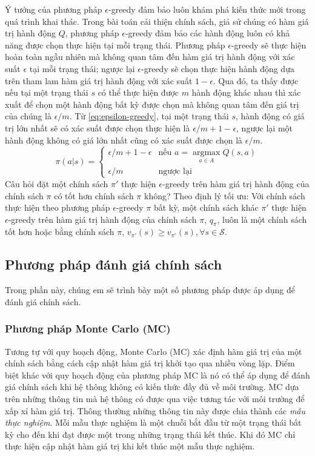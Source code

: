 Ý tưởng của phương pháp $\epsilon$-greedy đảm bảo luôn khám phá kiến thức mới trong quá trình khai thác. Trong bài toán cải thiện chính sách, giả sử chúng có hàm giá trị hành động $Q$, phương pháp $\epsilon$-greedy đảm bảo các hành động luôn có khả năng được chọn thực hiện tại mỗi trạng thái. Phương pháp $\epsilon$-greedy sẽ thực hiện hoàn toàn ngẫu nhiên mà không quan tâm đến hàm giá trị hành động với xác suất $\epsilon$ tại mỗi trạng thái; ngược lại $\epsilon$-greedy sẽ chọn thực hiện hành động dựa trên tham lam hàm giá trị hành động với xác suất $1 - \epsilon$. Qua đó, ta thấy được nếu tại một trạng thái $s$ có thể thực hiện được $m$ hành động khác nhau thì xác xuất để chọn một hành động bất kỳ được chọn mà không quan tâm đến giá trị của chúng là $\epsilon/m$. Từ \ref{eq:epsilon-greedy}, tại một trạng thái $s$, hành động có giá trị lớn nhất sẽ có xác suất được chọn thực hiện là $\epsilon/m + 1 - \epsilon$, ngược lại một hành động không có giá lớn nhất cũng có xác suất được chọn là $\epsilon/m$. 
\begin{equation}
\pi(a|s) =
\left\{\begin{matrix}
\epsilon/m + 1 - \epsilon & \text{nếu }a = \underset{a \in A}{\operatorname{argmax}}Q(s,a)\\ 
\epsilon/m & \text{ngược lại}
\end{matrix}\right.
\label{eq:epsilon-greedy}
\end{equation}
Câu hỏi đặt một chính sách $\pi'$ thực hiện $\epsilon$-greedy trên hàm giá trị hành động của  chính sách $\pi$ có tốt hơn chính sách $\pi$ không? Theo định lý tối ưu: Với chính sách thực hiện theo phương pháp $\epsilon$-greedy $\pi$ bất kỳ, một chính sách khác $\pi'$ thực hiện $\epsilon$-greedy trên hàm giá trị hành động của chính sách $\pi$, $q_{\pi}$, luôn là một chính sách tốt hơn hoặc bằng chính sách $\pi$, $v_{\pi'}(s) \geq v_{\pi'}(s), \forall s \in \mathcal{S}$.

\subsection{Phương pháp đánh giá chính sách}
Trong phần này, chúng em sẽ trình bày một số phương pháp được áp dụng để đánh giá chính sách.


\subsubsection{Phương pháp Monte Carlo (MC)}
Tương tự với quy hoạch động, Monte Carlo (MC) xác định hàm giá trị của một chính sách bằng cách cập nhật hàm giá trị khởi tạo qua nhiều vòng lặp. Điểm biệt khác với quy hoạch động của phương pháp MC là nó có thể áp dụng để đánh giá chính sách khi hệ thông không có kiến thức đầy đủ về môi trường. MC dựa trên những thông tin mà hệ thông có được qua việc tương tác với môi trường để xấp xỉ hàm giá trị. Thông thường những thông tin này được chia thành các \textit{mẫu thực nghiệm}. Mỗi mẫu thực nghiệm là một chuỗi bắt đầu từ một trạng thái bất kỳ cho đến khi đạt được một trong những trạng thái kết thúc. Khi đó MC chỉ thực hiện cập nhật hàm giá trị khi kết thúc một mẫu thực nghiệm.

